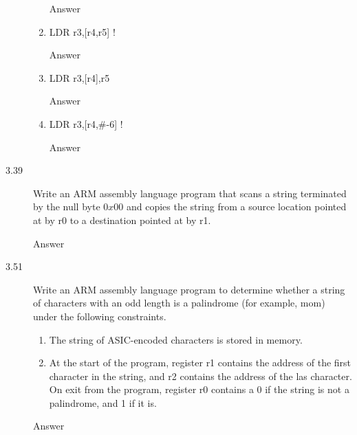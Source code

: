 \documentclass[letterpaper,10pt,titlepage]{article}
\begin{document}
\begin{description}
\begin{enumerate}
        Answer
        \item LDR r3,[r4,r5] !
        
        Answer
        \item LDR r3,[r4],r5
        
        Answer
        \item LDR r3,[r4,\#-6] !
        
        Answer
    \end{enumerate}
    \item[3.39] Write an ARM assembly language program that scans a string terminated by the null byte $0x00$ and copies the string from a source location pointed at by r0 to a destination pointed at by r1.
    
    Answer
    \item[3.51] Write an ARM assembly language program to determine whether a string of characters with an odd length is a palindrome (for example, mom) under the following constraints.
    \begin{enumerate}
        \item The string of ASIC-encoded characters is stored in memory.
        \item At the start of the program, register r1 contains the address of the first character in the string, and r2 contains the address of the las character. On exit from the program, register r0 contains a 0 if the string is not a palindrome, and 1 if it is.
    \end{enumerate}
    
    Answer
\end{description}

%
\end{document}
